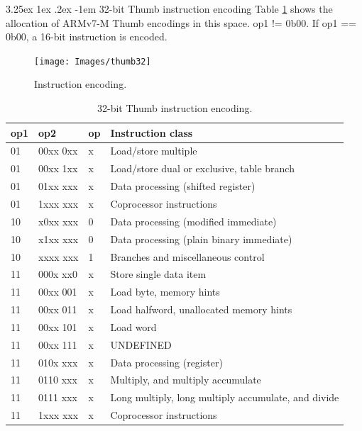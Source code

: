 \documentclass[11pt]{report}
\makeatletter
\renewcommand\paragraph{\@startsection{paragraph}{5}{\z@}%
	{3.25ex \@plus1ex \@minus.2ex}%
	{-1em}%
	{\normalfont\normalsize\bfseries}}
\makeatother
\begin{document}
		\paragraph{32-bit Thumb instruction encoding} Table \ref{tab:thumb32} shows the allocation of ARMv7-M Thumb encodings in this space. op1 != 0b00. If op1 == 0b00, a 16-bit instruction is encoded.
		
		\begin{figure} [H]
			\centering
			\texttt{[image: Images/thumb32]}
			\caption{Instruction encoding.}
			\label{fig:thumb32}
		\end{figure}

			\begin{table}[H]
				\centering
				\caption{32-bit Thumb instruction encoding.}
				\label{tab:thumb32}
				\begin{tabular}{l|l|l|l}
					\hline 
					\textbf{op1} & \textbf{op2} & \textbf{op} & \textbf{Instruction class} \\ \hline
					01 & 00xx 0xx & x & Load/store multiple \\
					01 & 00xx 1xx & x & Load/store dual or exclusive, table branch \\
					01 & 01xx xxx & x & Data processing (shifted register) \\
					01 & 1xxx xxx & x & Coprocessor instructions \\
					10 & x0xx xxx & 0 & Data processing (modified immediate) \\
					10 & x1xx xxx & 0 & Data processing (plain binary immediate)  \\
					10 & xxxx xxx & 1 & Branches and miscellaneous control  \\
					11 & 000x xx0 & x & Store single data item \\
					11 & 00xx 001 & x & Load byte, memory hints \\
					11 & 00xx 011 & x & Load halfword, unallocated memory hints \\
					11 & 00xx 101 & x & Load word \\
					11 & 00xx 111 & x & UNDEFINED \\
					11 & 010x xxx & x & Data processing (register) \\
					11 & 0110 xxx & x & Multiply, and multiply accumulate\\
					11 & 0111 xxx & x & Long multiply, long multiply accumulate, and divide \\
					11 & 1xxx xxx & x & Coprocessor instructions \\
					\hline
				\end{tabular}
			\end{table}
		
\end{document}
